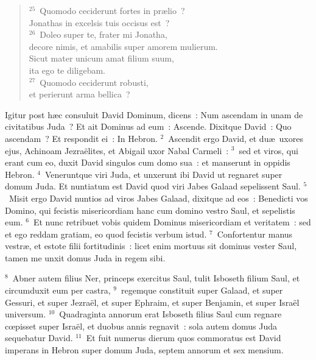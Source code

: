 \begin{flushleft}\begin{verse}${}^{25}$~Quomodo ceciderunt fortes in pr\ae lio~?\\ Jonathas in excelsis tuis occisus est~?\\
${}^{26}$~Doleo super te, frater mi Jonatha,\\ decore nimis, et amabilis super amorem mulierum.\\ Sicut mater unicum amat filium suum,\\ ita ego te diligebam.\\
${}^{27}$~Quomodo ceciderunt robusti,\\ et perierunt arma bellica~?\end{verse}\end{flushleft}



\lettrine[lines=3,image=true,loversize=0.05,lraise=-0.03]{I}{}gitur post h\ae c consuluit David Dominum, dicens~: Num ascendam in unam de civitatibus Juda~? Et ait Dominus ad eum~: Ascende. Dixitque David~: Quo ascendam~? Et respondit ei~: In Hebron.
${}^{2}$~Ascendit ergo David, et du\ae\ uxores ejus, Achinoam Jezra\"elites, et Abigail uxor Nabal Carmeli~:
${}^{3}$~sed et viros, qui erant cum eo, duxit David singulos cum domo sua~: et manserunt in oppidis Hebron.
${}^{4}$~Veneruntque viri Juda, et unxerunt ibi David ut regnaret super domum Juda. Et nuntiatum est David quod viri Jabes Galaad sepelissent Saul.
${}^{5}$~Misit ergo David nuntios ad viros Jabes Galaad, dixitque ad eos~: Benedicti vos Domino, qui fecistis misericordiam hanc cum domino vestro Saul, et sepelistis eum.
${}^{6}$~Et nunc retribuet vobis quidem Dominus misericordiam et veritatem~: sed et ego reddam gratiam, eo quod fecistis verbum istud.
${}^{7}$~Confortentur manus vestr\ae , et estote filii fortitudinis~: licet enim mortuus sit dominus vester Saul, tamen me unxit domus Juda in regem sibi.


${}^{8}$~Abner autem filius Ner, princeps exercitus Saul, tulit Isboseth filium Saul, et circumduxit eum per castra,
${}^{9}$~regemque constituit super Galaad, et super Gessuri, et super Jezra\"el, et super Ephraim, et super Benjamin, et super Isra\"el universum.
${}^{10}$~Quadraginta annorum erat Isboseth filius Saul cum regnare cœpisset super Isra\"el, et duobus annis regnavit~: sola autem domus Juda sequebatur David.
${}^{11}$~Et fuit numerus dierum quos commoratus est David imperans in Hebron super domum Juda, septem annorum et sex mensium.


